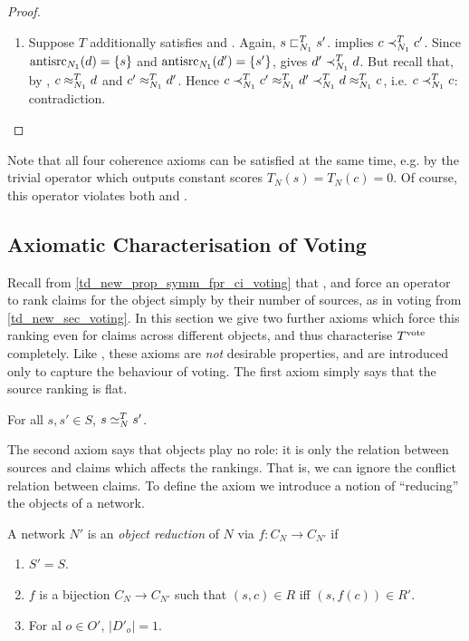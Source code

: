 \begin{proof}
\begin{enumerate}
        \item Suppose $T$ additionally satisfies \sourceposresp{} and
              \anticoherence{}. Again, $s \sqsubset_{N_1}^T s'$. \claimcoherence{}
              implies $c \prec_{N_1}^T c'$. Since $\operatorname{antisrc}_{N_1}(d) = \{s\}$
              and $\operatorname{antisrc}_{N_1}(d') = \{s'\}$, \anticoherence{} gives $d'
              \prec_{N_1}^T d$. But recall that, by \symmetry{}, $c \approx_{N_1}^T
              d$ and $c' \approx_{N_1}^T d'$. Hence $c \prec_{N_1}^T c'
              \approx_{N_1}^T d' \prec_{N_1}^T d \approx_{N_1}^T c$, i.e. $c
              \prec_{N_1}^T c$: contradiction.
    \end{enumerate}
\end{proof}

Note that all four coherence axioms can be satisfied at the same time, e.g. by
the trivial operator which outputs constant scores $T_N(s) = T_N(c) = 0$. Of
course, this operator violates both \freshposresp{} and \sourceposresp{}.

\subsection{Axiomatic Characterisation of Voting}
\label{td_new_sec_a_characterisation_of_voting}

Recall from \cref{td_new_prop_symm_fpr_ci_voting} that \symmetry{},
\freshposresp{} and \classicalindependence{} force an operator to rank claims
for the object simply by their number of sources, as in voting from
\cref{td_new_sec_voting}. In this section we give two further axioms which
force this ranking even for claims across different objects, and thus
characterise $T^{\operatorname{vote}}{}$ completely. Like \classicalindependence{}, these
axioms are \emph{not} desirable properties, and are introduced only to capture
the behaviour of voting. The first axiom simply says that the source ranking is
flat.

\begin{axiom}[\flatsources{}]
    For all $s, s' \in S$, $s \simeq_N^T s'$.
\end{axiom}

The second axiom says that objects play no role: it is only the relation
between sources and claims which affects the rankings. That is, we can ignore
the conflict relation between claims. To define the axiom we introduce a notion
of ``reducing'' the objects of a network.

\begin{definition}
    A network $N'$ is an \emph{object reduction} of $N$ via $f: C_N \to C_{N'}$
    if
    \begin{enumerate}
        \item $S' = S$.
        \item $f$ is a bijection $C_N \to C_{N'}$ such that $(s, c) \in R$
              iff $(s, f(c)) \in R'$.
        \item For al $o \in O'$, $|D'_o| = 1$.
    \end{enumerate}
\end{definition}

